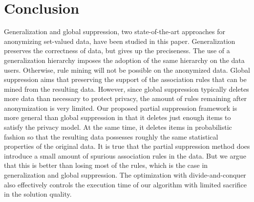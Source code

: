 \section{Conclusion}
\label{sec:conclude}
Generalization and global suppression, two state-of-the-art approaches for
anonymizing set-valued data, have been studied in this paper. 
Generalization preserves the correctness of data, but gives up the preciseness.
The use of a generalization hierarchy imposes the adoption of the 
same hierarchy on the data users. Otherwise, rule mining will not be possible
on the anonymized data. Global suppression aims that preserving the support
of the association rules that can be mined from the resulting data. However,
since global suppression typically deletes more data than necessary to protect
privacy, the amount of rules remaining after anonymization is very limited.
Our proposed partial suppression framework is more general than global
suppression in that it deletes just enough items to satisfy the privacy model. 
At the same time, it deletes items in probabilistic fashion so that the 
resulting data possesses roughly the same statistical properties of the 
original data. It is true that the partial suppression method does introduce
a small amount of spurious association rules in the data. 
But we argue that this is better than
losing most of the rules, which is the case in generalization and 
global suppression. The optimization with divide-and-conquer also effectively
controls the execution time of our algorithm with limited sacrifice in
the solution quality.

